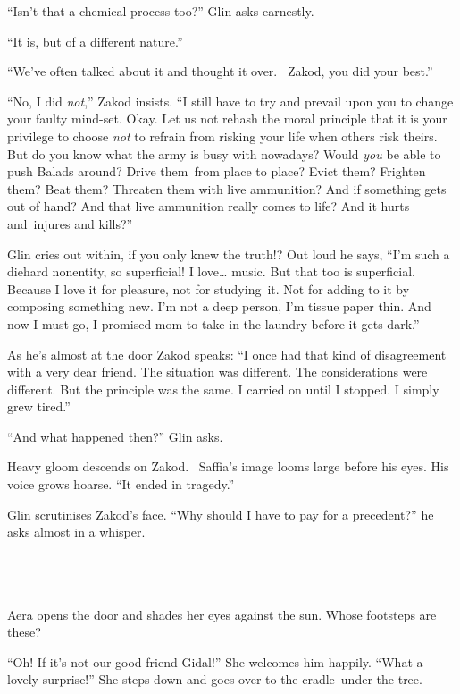 \documentclass[twoside,11pt]{book}
\begin{document}
``Isn't that a chemical process too?'' Glin asks{
}earnestly.

``It is, but of a different nature.''

``We've often talked about it and thought it over. \ Zakod, you did your best.''

``No, I did \textit{not},'' Zakod insists. ``I still have to try and prevail upon
you to change your faulty mind-set. Okay. Let us not rehash the moral principle that it is your privilege to choose
\textit{not} to refrain from risking your life when others risk theirs. But do you know what the army is busy with
nowadays? Would \textit{you} be able to push Balads around? Drive them~from place to place? Evict them? Frighten them?
Beat them? Threaten them with live ammunition? And if something gets out of hand? And that live ammunition really comes
to life? And it hurts and~injures and kills?''

Glin cries out within, if you only knew the truth!? Out loud he says, ``I'm such a diehard nonentity, so
superficial! I love{\dots} music. But that too is superficial. Because I love it for pleasure, not for studying~it. Not
for adding to it by composing something new. I'm not a deep person, I'm tissue paper thin. And now I must go, I
promised mom to take in the laundry before it gets dark.''

As he's almost at the door Zakod speaks: ``I once had that kind of disagreement with a very dear friend.
The situation was different. The considerations were different. But the principle was the same. I carried on until I
stopped. I simply{ }grew tired.''

``And what happened then?'' Glin asks.

Heavy gloom descends on Zakod. \ Saffia's image looms large before his eyes. His voice grows hoarse. ``It
ended in tragedy.''

Glin scrutinises Zakod's face. ``Why should{ }I have to pay for a
precedent?'' he asks almost in a whisper.

~

\chapter{}

Aera opens the door and shades her eyes against the sun. Whose footsteps are these?

``Oh! If it's not our good friend Gidal!'' She welcomes him happily. ``What a
lovely surprise!'' She steps down and goes over to the
cradle~under{ }the tree.
\end{document}
